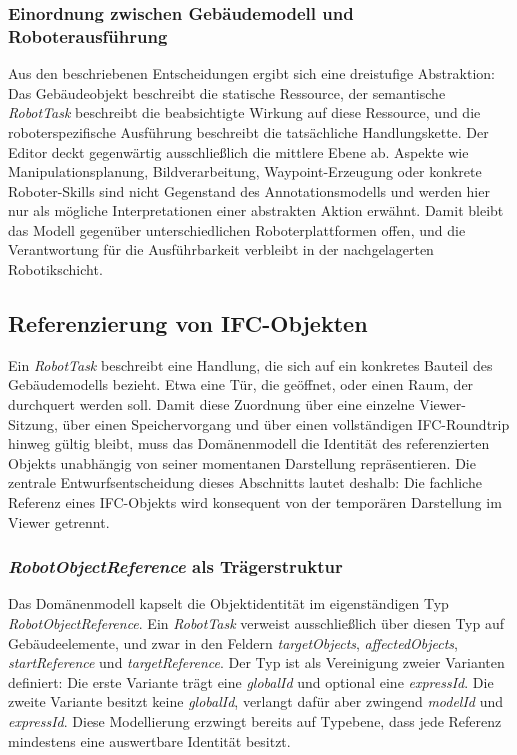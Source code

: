 \subsubsection{Einordnung zwischen Gebäudemodell und Roboterausführung}
Aus den beschriebenen Entscheidungen ergibt sich eine dreistufige Abstraktion: Das Gebäudeobjekt
beschreibt die statische Ressource, der semantische \textit{RobotTask} beschreibt die beabsichtigte Wirkung
auf diese Ressource, und die roboterspezifische Ausführung beschreibt die tatsächliche
Handlungskette. Der Editor deckt gegenwärtig ausschließlich die mittlere Ebene ab. Aspekte wie
Manipulationsplanung, Bildverarbeitung, Waypoint-Erzeugung oder konkrete Roboter-Skills sind nicht
Gegenstand des Annotationsmodells und werden hier nur als mögliche Interpretationen einer abstrakten
Aktion erwähnt. Damit bleibt das Modell gegenüber unterschiedlichen Roboterplattformen offen, und
die Verantwortung für die Ausführbarkeit verbleibt in der nachgelagerten Robotikschicht.

\subsection{Referenzierung von IFC-Objekten}\label{subsec:Referenzierung_IFC-Objekten}
Ein \textit{RobotTask} beschreibt eine Handlung, die sich auf ein konkretes Bauteil des
Gebäudemodells bezieht. Etwa eine Tür, die geöffnet, oder einen Raum, der durchquert werden soll.
Damit diese Zuordnung über eine einzelne Viewer-Sitzung, über einen Speichervorgang und über einen
vollständigen IFC-Roundtrip hinweg gültig bleibt, muss das Domänenmodell die Identität des
referenzierten Objekts unabhängig von seiner momentanen Darstellung repräsentieren. Die zentrale
Entwurfsentscheidung dieses Abschnitts lautet deshalb: Die fachliche Referenz eines IFC-Objekts wird
konsequent von der temporären Darstellung im Viewer getrennt.

\subsubsection{\textit{RobotObjectReference} als Trägerstruktur}
Das Domänenmodell kapselt die Objektidentität im eigenständigen Typ \textit{RobotObjectReference}.
Ein \textit{RobotTask} verweist ausschließlich über diesen Typ auf Gebäudeelemente, und zwar in den
Feldern \textit{targetObjects}, \textit{affectedObjects}, \textit{startReference} und
\textit{targetReference}. Der Typ ist als Vereinigung zweier Varianten definiert: Die erste Variante
trägt eine \textit{globalId} und optional eine \textit{expressId}. Die zweite Variante besitzt keine
\textit{globalId}, verlangt dafür aber zwingend \textit{modelId} und \textit{expressId}. Diese
Modellierung erzwingt bereits auf Typebene, dass jede Referenz mindestens eine auswertbare Identität
besitzt.

